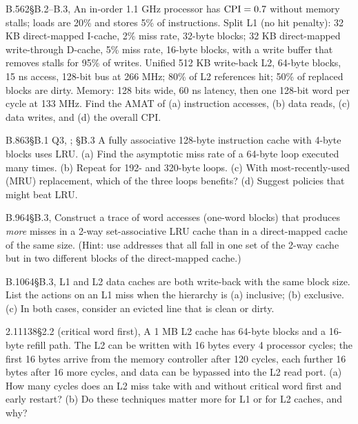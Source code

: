 \begin{tbexercise}[B]{B.5}{62}{\S B.2--B.3, }
An in-order 1.1 GHz processor has $\mathrm{CPI}=0.7$ without memory stalls; loads are 20\%
and stores 5\% of instructions. Split L1 (no hit penalty): 32 KB direct-mapped
I-cache, 2\% miss rate, 32-byte blocks; 32 KB direct-mapped write-through D-cache,
5\% miss rate, 16-byte blocks, with a write buffer that removes stalls for 95\% of
writes. Unified 512 KB write-back L2, 64-byte blocks, 15 ns access, 128-bit bus at
266 MHz; 80\% of L2 references hit; 50\% of replaced blocks are dirty. Memory:
128 bits wide, 60 ns latency, then one 128-bit word per cycle at 133 MHz. Find the
AMAT of (a) instruction accesses, (b) data reads, (c) data writes, and (d) the
overall CPI.
\end{tbexercise}

\begin{tbexercise}[B]{B.8}{63}{\S B.1 Q3, ; \S B.3}
A fully associative 128-byte instruction cache with 4-byte blocks uses LRU. (a) Find
the asymptotic miss rate of a 64-byte loop executed many times. (b) Repeat for
192- and 320-byte loops. (c) With most-recently-used (MRU) replacement, which of
the three loops benefits? (d) Suggest policies that might beat LRU.
\end{tbexercise}

\begin{tbexercise}[B]{B.9}{64}{\S B.3, }
Construct a trace of word accesses (one-word blocks) that produces \emph{more}
misses in a 2-way set-associative LRU cache than in a direct-mapped cache of the
same size. (Hint: use addresses that all fall in one set of the 2-way cache but
in two different blocks of the direct-mapped cache.)
\end{tbexercise}

\begin{tbexercise}[B]{B.10}{64}{\S B.3, }
L1 and L2 data caches are both write-back with the same block size. List the
actions on an L1 miss when the hierarchy is (a) inclusive; (b) exclusive. (c) In
both cases, consider an evicted line that is clean or dirty.
\end{tbexercise}

\begin{tbexercise}{2.11}{138}{\S2.2 (critical word first), }
A 1 MB L2 cache has 64-byte blocks and a 16-byte refill path. The L2 can be
written with 16 bytes every 4 processor cycles; the first 16 bytes arrive from the
memory controller after 120 cycles, each further 16 bytes after 16 more cycles, and
data can be bypassed into the L2 read port. (a) How many cycles does an L2 miss
take with and without critical word first and early restart? (b) Do these
techniques matter more for L1 or for L2 caches, and why?
\end{tbexercise}

